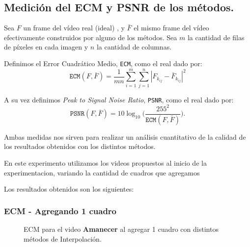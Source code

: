 \subsection{Medición del ECM y PSNR de los métodos.}\label{ECM}
Sea $F$ un frame del vídeo real (ideal) , y $\bar{F}$ el mismo frame del vídeo efectivamente construidos por alguno de los métodos. Sea $m$ la cantidad de filas de píxeles en cada imagen y $n$ la cantidad de columnas.

Definimos el Error Cuadrático Medio, \texttt{ECM}, como el real dado por:
\begin{equation}
\texttt{ECM}(F,\bar{F}) = \frac{1}{mn}\sum_{i=1}^m\sum_{j = 1}^n |F_{k_{ij}} - \bar{F}_{k_{ij}}|^2
\end{equation}

A su vez definimos \emph{Peak to Signal Noise Ratio}, \texttt{PSNR}, como el real dado por:
\begin{equation}
\texttt{PSNR}(F,\bar{F}) = 10 \log_{10}\bigg(\frac{255^2}{\texttt{ECM}(F,\bar{F})}\bigg). \label{eq:psnr}
\end{equation}

Ambas medidas nos sirven para realizar un análisis cuantitativo de la calidad de los resultados obtenidos con los distintos métodos.

En este experimento utilizamos los videos propuestos al inicio de la experimentacion, variando la cantidad de cuadros que agregamos


Los resultados obtenidos son los siguientes:

\subsubsection{ECM - Agregando 1 cuadro}

\begin{figure}[H]
	\centering
	\caption{ECM para el video \textbf{Amanecer} al agregar 1 cuadro con distintos métodos de Interpolación.}
	\label{fig:ecm_sunrise}
\end{figure}

